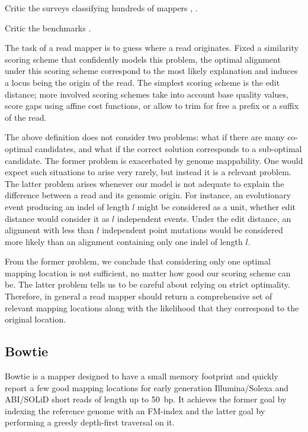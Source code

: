 Critic the surveys classifying hundreds of mappers \citep{Li2010}, \citep{Fonseca2012}.

Critic the benchmarks \citep{Hatem2013} \citep{Holtgrewe2011}.

The task of a read mapper is to guess where a read originates.
Fixed a similarity scoring scheme that confidently models this problem, the optimal alignment under this scoring scheme correspond to the most likely explanation and induces a locus being the origin of the read.
The simplest scoring scheme is the edit distance; more involved scoring schemes take into account base quality values, score gaps using affine cost functions, or allow to trim for free a prefix or a suffix of the read.

The above definition does not consider two problems: what if there are many co-optimal candidates, and what if the correct solution corresponds to a sub-optimal candidate.
The former problem is exacerbated by genome mappability.
One would expect such situations to arise very rarely, but instead it is a relevant problem.
The latter problem arises whenever our model is not adequate to explain the difference between a read and its genomic origin.
For instance, an evolutionary event producing an indel of length $l$ might be considered as a unit, whether edit distance would consider it as $l$ independent events.
Under the edit distance, an alignment with less than $l$ independent point mutations would be considered more likely than an alignment containing only one indel of length $l$.

From the former problem, we conclude that considering only one optimal mapping location is not sufficient, no matter how good our scoring scheme can be.
The latter problem tells us to be careful about relying on strict optimality.
Therefore, in general a read mapper should return a comprehensive set of relevant mapping locations along with the likelihood that they correspond to the original location.


\subsection{Bowtie}

Bowtie \citep{Bowtie} is a mapper designed to have a small memory footprint and quickly report a few good mapping locations for early generation Illumina/Solexa and ABI/SOLiD short reads of length up to 50~bp.
It achieves the former goal by indexing the reference genome with an FM-index and the latter goal by performing a greedy depth-first traversal on it.

